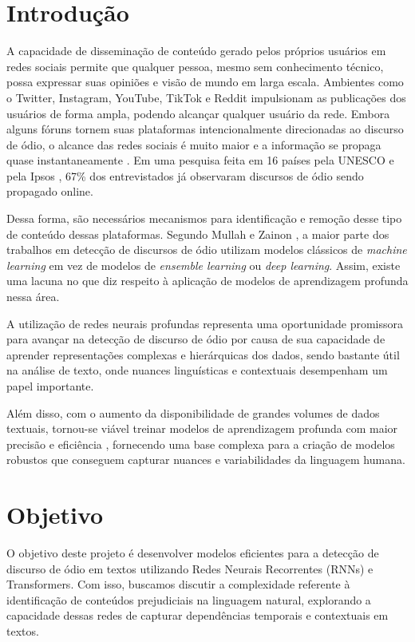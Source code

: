 \documentclass[conference]{IEEEtran}
\begin{document}
\section{Introdução}
A capacidade de disseminação de conteúdo gerado pelos próprios usuários em redes sociais permite que qualquer pessoa, mesmo sem conhecimento técnico, possa expressar suas opiniões e visão de mundo em larga escala. Ambientes como o Twitter, Instagram, YouTube, TikTok e Reddit impulsionam as publicações dos usuários de forma ampla, podendo alcançar qualquer usuário da rede. Embora alguns fóruns tornem suas plataformas intencionalmente direcionadas ao discurso de ódio, o alcance das redes sociais é muito maior e a informação se propaga quase instantaneamente \cite{Guiora2017}. Em uma pesquisa feita em 16 países pela UNESCO e pela Ipsos \cite{IPSOS}, 67\% dos entrevistados já observaram discursos de ódio sendo propagado online.

Dessa forma, são necessários mecanismos para identificação e remoção desse tipo de conteúdo dessas plataformas. Segundo Mullah e Zainon \cite{mullah}, a maior parte dos trabalhos em detecção de discursos de ódio utilizam modelos clássicos de \textit{machine learning} em vez de modelos de \textit{ensemble learning} ou \textit{deep learning}. Assim, existe uma lacuna no que diz respeito à aplicação de modelos de aprendizagem profunda nessa área.

A utilização de redes neurais profundas representa uma oportunidade promissora para avançar na detecção de discurso de ódio por causa de sua capacidade de aprender representações complexas e hierárquicas dos dados, sendo bastante útil na análise de texto, onde nuances linguísticas e contextuais desempenham um papel importante.

Além disso, com o aumento da disponibilidade de grandes volumes de dados textuais, tornou-se viável treinar modelos de aprendizagem profunda com maior precisão e eficiência \cite{deep}, fornecendo uma base complexa para a criação de modelos robustos que conseguem capturar nuances e variabilidades da linguagem humana.

\section{Objetivo}

O objetivo deste projeto é desenvolver modelos eficientes para a detecção de discurso de ódio em textos utilizando Redes Neurais Recorrentes (RNNs) e Transformers. Com isso, buscamos discutir a complexidade referente à identificação de conteúdos prejudiciais na linguagem natural, explorando a capacidade dessas redes de capturar dependências temporais e contextuais em textos.
\end{document}
